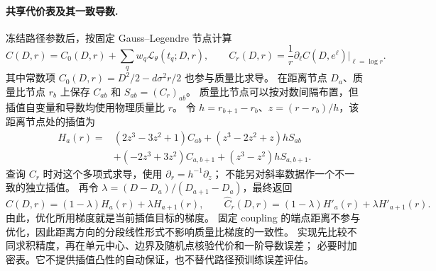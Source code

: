 \documentclass[UTF8,a4paper,11pt,fontset=fandol]{ctexart}
\begin{document}
\paragraph{共享代价表及其一致导数.}
冻结路径参数后，按固定 Gauss--Legendre 节点计算
\begin{equation}
C(D,r)=C_0(D,r)+\sum_q w_q\mathcal L_\theta(t_q;D,r),\qquad
C_r(D,r)=\frac1r\partial_\ell C(D,e^\ell)\big|_{\ell=\log r}.
\end{equation}
其中常数项 $C_0(D,r)=D^2/2-d\sigma^2r/2$ 也参与质量比求导。
在距离节点 $D_a$、质量比节点 $r_b$ 上保存 $C_{ab}$ 和 $S_{ab}=(C_r)_{ab}$。
质量比节点可以按对数间隔布置，但插值自变量和导数均使用物理质量比 $r$。
令 $h=r_{b+1}-r_b$、$z=(r-r_b)/h$，该距离节点处的插值为
\begin{equation}
\begin{aligned}
H_a(r)={}&(2z^3-3z^2+1)C_{ab}+(z^3-2z^2+z)hS_{ab}\\
&+(-2z^3+3z^2)C_{a,b+1}+(z^3-z^2)hS_{a,b+1}.
\end{aligned}
\end{equation}
查询 $C_r$ 时对这个多项式求导，使用 $\partial_r=h^{-1}\partial_z$；
不能另对斜率数据作一个不一致的独立插值。
再令 $\lambda=(D-D_a)/(D_{a+1}-D_a)$，最终返回
\begin{equation}
\widehat C(D,r)=(1-\lambda)H_a(r)+\lambda H_{a+1}(r),\qquad
\widehat C_r(D,r)=(1-\lambda)H'_a(r)+\lambda H'_{a+1}(r).
\end{equation}
由此，优化所用梯度就是当前插值目标的梯度。
固定 coupling 的端点距离不参与优化，因此距离方向的分段线性形式不影响质量比梯度的一致性。
实现先比较不同求积精度，再在单元中心、边界及随机点核验代价和一阶导数误差；
必要时加密表。它不提供插值凸性的自动保证，也不替代路径预训练误差评估。
\end{document}
